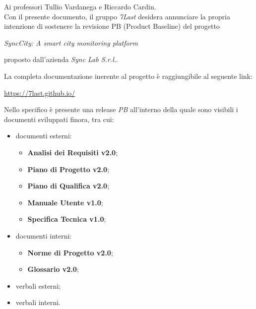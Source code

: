 \documentclass[italian,12pt]{article} %
\begin{document}

\newpage

\begin{flushleft}
    Ai professori Tullio Vardanega e Riccardo Cardin.\\
    Con il presente documento, il gruppo \textit{7Last} desidera annunciare la propria intenzione di sostenere la revisione PB (Product Baseline) del progetto 
    \begin{center}
        \textit{SyncCity: A smart city monitoring platform} 
    \end{center}
    proposto dall'azienda \textit{Sync Lab S.r.l.}.
\end{flushleft}
\begin{flushleft}
    La completa documentazione inerente al progetto è raggiungibile al seguente link:  
    \begin{center}
        \url{https://7last.github.io/}
    \end{center}
\end{flushleft}
\begin{flushleft}
    Nello specifico è presente una release \textit{PB} all'interno della quale sono visibili i documenti sviluppati finora, tra cui:
    \begin{itemize}
        \item documenti esterni:
        \begin{itemize}
            \item \textbf{Analisi dei Requisiti v2.0};
            \item \textbf{Piano di Progetto v2.0};
            \item \textbf{Piano di Qualifica v2.0};
            \item \textbf{Manuale Utente v1.0};
            \item \textbf{Specifica Tecnica v1.0};
        \end{itemize}
        \item documenti interni:
        \begin{itemize}
            \item \textbf{Norme di Progetto v2.0};
            \item \textbf{Glossario v2.0};
        \end{itemize}
        \item verbali esterni;
        \item verbali interni.
    \end{itemize}
\end{flushleft}
\newblock
\end{document}
